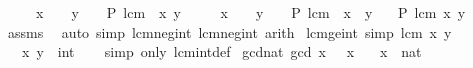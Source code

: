 \begin{isabellebody}
\ \ \ \ \ {\isachardoublequoteopen}x\ {\isasymle}\ {}\ {\isasymLongrightarrow}\ y\ {\isasymge}\ {}\ {\isasymLongrightarrow}\ P\ {\isacharparenleft}{\kern0pt}lcm\ {\isacharparenleft}{\kern0pt}{\isacharminus}{\kern0pt}\ x{\isacharparenright}{\kern0pt}\ y{\isacharparenright}{\kern0pt}{\isachardoublequoteclose}\isanewline
\ \ \ \ \ {\isachardoublequoteopen}x\ {\isasymle}\ {}\ {\isasymLongrightarrow}\ y\ {\isasymle}\ {}\ {\isasymLongrightarrow}\ P\ {\isacharparenleft}{\kern0pt}lcm\ {\isacharparenleft}{\kern0pt}{\isacharminus}{\kern0pt}\ x{\isacharparenright}{\kern0pt}\ {\isacharparenleft}{\kern0pt}{\isacharminus}{\kern0pt}\ y{\isacharparenright}{\kern0pt}{\isacharparenright}{\kern0pt}{\isachardoublequoteclose}\isanewline
\ \ \ {\isachardoublequoteopen}P\ {\isacharparenleft}{\kern0pt}lcm\ x\ y{\isacharparenright}{\kern0pt}{\isachardoublequoteclose}\isanewline
%
\isadelimproof
\ \ %
\endisadelimproof
%
\isatagproof
{}\isamarkupfalse%
\ assms\ \isamarkupfalse%
\ {\isacharparenleft}{\kern0pt}auto\ simp{\isacharcolon}{\kern0pt}\ lcm{\isacharunderscore}{\kern0pt}neg{}{\isacharunderscore}{\kern0pt}int\ lcm{\isacharunderscore}{\kern0pt}neg{}{\isacharunderscore}{\kern0pt}int{\isacharparenright}{\kern0pt}\ arith%
\endisatagproof
{\isafoldproof}%
%
\isadelimproof
\isanewline
%
\endisadelimproof
\isanewline
{}\isamarkupfalse%
\ lcm{\isacharunderscore}{\kern0pt}ge{\isacharunderscore}{\kern0pt}{}{\isacharunderscore}{\kern0pt}int\ {\isacharbrackleft}{\kern0pt}simp{\isacharbrackright}{\kern0pt}{\isacharcolon}{\kern0pt}\ {\isachardoublequoteopen}lcm\ x\ y\ {\isasymge}\ {}{\isachardoublequoteclose}\isanewline
\ \ \ x\ y\ {\isacharcolon}{\kern0pt}{\isacharcolon}{\kern0pt}\ int\isanewline
%
\isadelimproof
\ \ %
\endisadelimproof
%
\isatagproof
{}\isamarkupfalse%
\ {\isacharparenleft}{\kern0pt}simp\ only{\isacharcolon}{\kern0pt}\ lcm{\isacharunderscore}{\kern0pt}int{\isacharunderscore}{\kern0pt}def{\isacharparenright}{\kern0pt}%
\endisatagproof
{\isafoldproof}%
%
\isadelimproof
\isanewline
%
\endisadelimproof
\isanewline
{}\isamarkupfalse%
\ gcd{\isacharunderscore}{\kern0pt}{}{\isacharunderscore}{\kern0pt}nat{\isacharcolon}{\kern0pt}\ {\isachardoublequoteopen}gcd\ x\ {}\ {\isacharequal}{\kern0pt}\ x{\isachardoublequoteclose}\isanewline
\ \ \ x\ {\isacharcolon}{\kern0pt}{\isacharcolon}{\kern0pt}\ nat\isanewline

\end{isabellebody}
